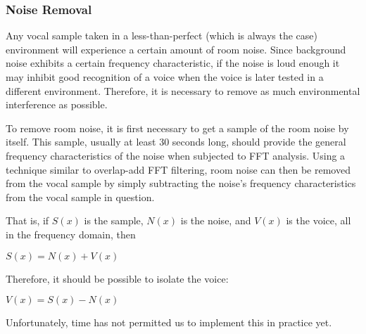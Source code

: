 \subsubsection{Noise Removal}

Any vocal sample taken in a less-than-perfect (which is always the case) environment will experience a certain
amount of room noise.  Since background noise exhibits a certain frequency characteristic,
if the noise is loud enough it may inhibit good recognition of a voice when the voice is
later tested in a different environment.  Therefore, it is necessary to remove as much
environmental interference as possible.

To remove room noise, it is first necessary to get a sample of the room noise by itself.
This sample, usually at least 30 seconds long, should provide the general frequency
characteristics of the noise when subjected to FFT analysis.  Using a technique similar
to overlap-add FFT filtering, room noise can then be removed from the vocal sample by
simply subtracting the noise's frequency characteristics from the vocal sample in question.

That is, if $S(x)$ is the sample, $N(x)$ is the noise, and $V(x)$ is the voice, all in the
frequency domain, then

\begin{center}$S(x) = N(x) + V(x)$\end{center}

Therefore, it should be possible to isolate the voice:

\begin{center}$V(x) = S(x) - N(x)$\end{center}

Unfortunately, time has not permitted us to implement this in practice yet.
